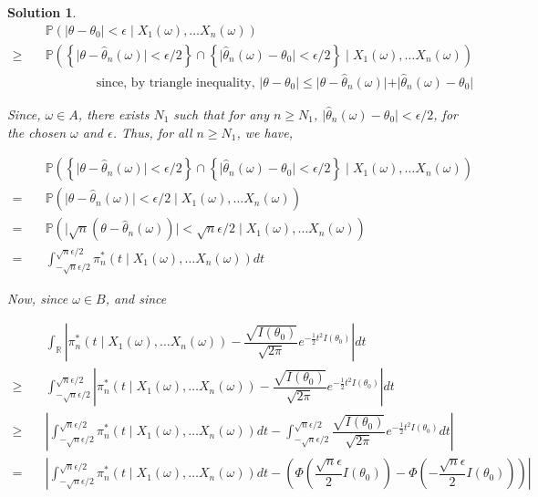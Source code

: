 \documentclass[12pt]{article}
\theoremstyle{problemstyle}
\newtheorem*{solution*}{Solution}
\newcommand{\prob}{\mathbb{P}}
\newcommand{\R}{\mathbb{R}}
\begin{document}
\begin{solution*}
    \begin{align*}
        & \prob(\vert \theta - \theta_0 \vert < \epsilon \mid X_1(\omega), \dots X_n(\omega))\\
        \geq \quad & \prob\left(\left\{ \vert \theta - \widehat{\theta}_n(\omega) \vert < \epsilon/2\right\} \cap \left\{ \vert \widehat{\theta}_n(\omega) - \theta_0 \vert < \epsilon/2\right\}  \mid X_1(\omega), \dots X_n(\omega) \right)\\
        & \qquad \qquad \text{since, by triangle inequality, } \vert \theta - \theta_0 \vert \leq \vert \theta - \widehat{\theta}_n(\omega)\vert + \vert \widehat{\theta}_n(\omega) - \theta_0 \vert
    \end{align*}

    Since, $\omega \in A$, there exists $N_1$ such that for any $n \geq N_1$, $\vert \widehat{\theta}_n(\omega) - \theta_0 \vert < \epsilon/2$, for the chosen $\omega$ and $\epsilon$. Thus, for all $n \geq N_1$, we have,

    \begin{align*}
        & \prob\left(\left\{ \vert \theta - \widehat{\theta}_n(\omega) \vert < \epsilon/2\right\} \cap \left\{ \vert \widehat{\theta}_n(\omega) - \theta_0 \vert < \epsilon/2\right\}  \mid X_1(\omega), \dots X_n(\omega) \right)\\
        = \quad & \prob\left( \vert \theta - \widehat{\theta}_n(\omega) \vert < \epsilon/2 \mid X_1(\omega), \dots X_n(\omega) \right)\\
        = \quad & \prob\left( \vert \sqrt{n}(\theta - \widehat{\theta}_n(\omega)) \vert < \sqrt{n}\epsilon/2 \mid X_1(\omega), \dots X_n(\omega) \right)\\
        = \quad & \int_{-\sqrt{n}\epsilon/2}^{\sqrt{n}\epsilon/2} \pi_n^\ast(t \mid X_1(\omega), \dots X_n(\omega)) dt
    \end{align*}

    Now, since $\omega \in B$, and since 

    \begin{align*}
        & \int_{\R} \left\vert \pi_n^\ast(t \mid X_1(\omega), \dots X_n(\omega)) - \dfrac{\sqrt{I(\theta_0)}}{\sqrt{2\pi}} e^{-\frac{1}{2}t^2I(\theta_0)} \right\vert dt\\
        \geq \quad & \int_{-\sqrt{n}\epsilon/2}^{\sqrt{n}\epsilon/2} \left\vert \pi_n^\ast(t \mid X_1(\omega), \dots X_n(\omega)) - \dfrac{\sqrt{I(\theta_0)}}{\sqrt{2\pi}} e^{-\frac{1}{2}t^2I(\theta_0)} \right\vert dt\\
        \geq \quad & \left\vert \int_{-\sqrt{n}\epsilon/2}^{\sqrt{n}\epsilon/2} \pi_n^\ast(t \mid X_1(\omega), \dots X_n(\omega)) dt - \int_{-\sqrt{n}\epsilon/2}^{\sqrt{n}\epsilon/2} \dfrac{\sqrt{I(\theta_0)}}{\sqrt{2\pi}} e^{-\frac{1}{2}t^2I(\theta_0)}dt \right\vert\\
        = \quad & \left\vert \int_{-\sqrt{n}\epsilon/2}^{\sqrt{n}\epsilon/2} \pi_n^\ast(t \mid X_1(\omega), \dots X_n(\omega)) dt - \left(\Phi\left( \dfrac{\sqrt{n}\epsilon}{2}I(\theta_0) \right) - \Phi\left( -\dfrac{\sqrt{n}\epsilon}{2}I(\theta_0) \right) \right) \right\vert
    \end{align*}


\end{solution*}
\end{document}
